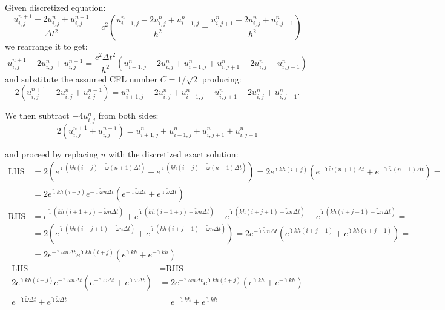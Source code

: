 \documentclass[english,notitlepage]{article}
\newcommand*{\ihat}{\hat{\imath}}
\begin{document}
Given discretized equation:
\begin{equation*}
\frac{u^{n+1}_{i,j} - 2u^n_{i,j} + u^{n-1}_{i, j}}{\Delta t^2} =
 c^2 \left(\frac{u^n_{i+1,j} - 2u^n_{i,j} + u^n_{i-1, j}}{h^2} + \frac{u^n_{i,j+1} - 2u^n_{i,j} + u^n_{i, j-1}}{h^2}\right)
\end{equation*}
we rearrange it to get:
\begin{equation*}
u^{n+1}_{i,j} - 2u^n_{i,j} + u^{n-1}_{i, j} = \frac{c^2 \Delta t^2}{h^2}
  \left(u^n_{i+1,j} - 2u^n_{i,j} + u^n_{i-1, j} + u^n_{i,j+1} - 2u^n_{i,j} + u^n_{i, j-1}\right)
\end{equation*}
and substitute the assumed CFL number $C=1/\sqrt{2}$ producing:
\begin{equation*}
2\left(u^{n+1}_{i,j} - 2u^n_{i,j} + u^{n-1}_{i, j}\right) =
  u^n_{i+1,j} - 2u^n_{i,j} + u^n_{i-1, j} + u^n_{i,j+1} - 2u^n_{i,j} + u^n_{i, j-1}.
\end{equation*}

We then subtract $-4u^n_{i,j}$ from both sides:
\begin{equation*}
2\left(u^{n+1}_{i,j} + u^{n-1}_{i, j}\right) = u^n_{i+1,j} + u^n_{i-1, j} + u^n_{i,j+1} + u^n_{i, j-1}
\end{equation*}

and proceed by replacing $u$ with the discretized exact solution:
\begin{align*}
    \text{LHS} &= 2\left(e^{\ihat(kh(i+j)-\tilde{\omega}(n+1)\Delta t)} + e^{\ihat(kh(i+j)-\tilde{\omega}(n-1)\Delta t)}\right) = 2e^{\ihat kh(i+j)}\left(e^{-\ihat\tilde{\omega}(n+1)\Delta t} + e^{-\ihat\tilde{\omega}(n-1)\Delta t}\right) = \\
    &= 2e^{\ihat kh(i+j)}e^{-\ihat \tilde{\omega}n\Delta t}\left(e^{-\ihat\tilde{\omega}\Delta t} + e^{\ihat\tilde{\omega}\Delta t}\right) \\[12pt]
    \text{RHS} &= e^{\ihat(kh(i+1+j)-\tilde{\omega}n\Delta t)} + e^{\ihat(kh(i-1+j)-\tilde{\omega}n\Delta t)} + e^{\ihat(kh(i+j+1)-\tilde{\omega}n\Delta t)} + e^{\ihat(kh(i+j-1)-\tilde{\omega}n\Delta t)} = \\
    &= 2\left(e^{\ihat(kh(i+j+1)-\tilde{\omega}n\Delta t)} + e^{\ihat(kh(i+j-1)-\tilde{\omega}n\Delta t)}\right) = 2e^{-\ihat \tilde{\omega}n\Delta t}\left(e^{\ihat kh(i+j+1)} + e^{\ihat kh(i+j-1)}\right) = \\
    &= 2e^{-\ihat \tilde{\omega}n\Delta t}e^{\ihat kh(i+j)}\left(e^{\ihat kh} + e^{-\ihat kh}\right)
\end{align*}
\begin{align*}
    \text{LHS} &= \text{RHS} \\
2e^{\ihat kh(i+j)}e^{-\ihat \tilde{\omega}n\Delta t}\left(e^{-\ihat\tilde{\omega}\Delta t} + e^{\ihat\tilde{\omega}\Delta t}\right) &= 2e^{-\ihat \tilde{\omega}n\Delta t}e^{\ihat kh(i+j)}\left(e^{\ihat kh} + e^{-\ihat kh}\right) \\
e^{-\ihat\tilde{\omega}\Delta t} + e^{\ihat\tilde{\omega}\Delta t} &= e^{-\ihat kh} + e^{\ihat kh}
\end{align*}
\end{document}
